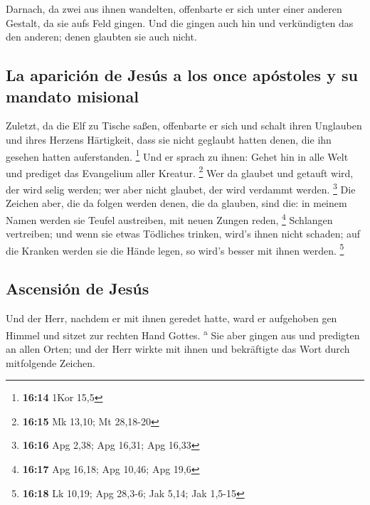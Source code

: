  Darnach, da zwei aus ihnen wandelten, offenbarte er sich
unter einer anderen Gestalt, da sie aufs Feld gingen. 
Und die gingen auch hin und verkündigten das den anderen; denen glaubten
sie auch nicht.

\hypertarget{la-apariciuxf3n-de-jesuxfas-a-los-once-apuxf3stoles-y-su-mandato-misional}{%
\subsection{La aparición de Jesús a los once apóstoles y su mandato
misional}\label{la-apariciuxf3n-de-jesuxfas-a-los-once-apuxf3stoles-y-su-mandato-misional}}

 Zuletzt, da die Elf zu Tische saßen, offenbarte er sich
und schalt ihren Unglauben und ihres Herzens Härtigkeit, dass sie nicht
geglaubt hatten denen, die ihn gesehen hatten auferstanden. \footnote{\textbf{16:14}
  1Kor 15,5}  Und er sprach zu ihnen: Gehet hin in alle
Welt und prediget das Evangelium aller Kreatur. \footnote{\textbf{16:15}
  Mk 13,10; Mt 28,18-20}  Wer da glaubet und getauft
wird, der wird selig werden; wer aber nicht glaubet, der wird verdammt
werden. \footnote{\textbf{16:16} Apg 2,38; Apg 16,31; Apg 16,33}
 Die Zeichen aber, die da folgen werden denen, die da
glauben, sind die: in meinem Namen werden sie Teufel austreiben, mit
neuen Zungen reden, \footnote{\textbf{16:17} Apg 16,18; Apg 10,46; Apg
  19,6}  Schlangen vertreiben; und wenn sie etwas
Tödliches trinken, wird's ihnen nicht schaden; auf die Kranken werden
sie die Hände legen, so wird's besser mit ihnen werden. \footnote{\textbf{16:18}
  Lk 10,19; Apg 28,3-6; Jak 5,14; Jak 1,5-15}

\hypertarget{ascensiuxf3n-de-jesuxfas}{%
\subsection{Ascensión de Jesús}\label{ascensiuxf3n-de-jesuxfas}}

 Und der Herr, nachdem er mit ihnen geredet hatte, ward
er aufgehoben gen Himmel und sitzet zur rechten Hand Gottes.
\textsuperscript{a}  Sie aber gingen aus und predigten an
allen Orten; und der Herr wirkte mit ihnen und bekräftigte das Wort
durch mitfolgende Zeichen.
